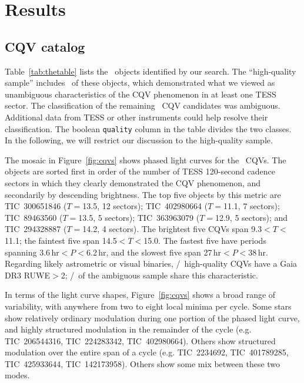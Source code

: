 \documentclass[11pt,twocolumn,tighten]{aastex63}
\begin{document}
\section{Results}
\label{sec:results}

\subsection{CQV catalog}
\label{sec:catalog}

Table~\ref{tab:thetable} lists the \ncpvsfound\ objects identified by
our search.  The ``high-quality sample'' includes \ngoods\ of these
objects, which demonstrated what we viewed as unambiguous
characteristics of the CQV phenomenon in at least one TESS sector.
The classification of the remaining \nmaybes\ CQV candidates was
ambiguous.  Additional data from TESS or other instruments could help
resolve their classification.  The boolean \texttt{quality} column in
the table divides the two classes.  In the following, we will restrict
our discussion to the high-quality sample.

The mosaic in Figure~\ref{fig:cqvs} shows phased light curves for the
\ngoods\ CQVs.  The objects are sorted first in order of the number of
TESS 120-second cadence sectors in which they clearly demonstrated the
CQV phenomenon, and secondarily by descending brightness.  The top
five objects by this metric are TIC~300651846 ($T$$=$13.5, 12
sectors); TIC~402980664 ($T$$=$11.1, 7 sectors); TIC~89463560
($T$$=$13.5, 5 sectors); TIC~363963079 ($T$$=$12.9, 5 sectors); and
TIC~294328887 ($T$$=$14.2, 4 sectors).  The brightest five CQVs span
9.3$<$$T$$<$11.1; the faintest five span 14.5$<$$T$$<$15.0.  The
fastest five have periods spanning 3.6\,hr$<$$P$$<$6.2\,hr, and the
slowest five span 27\,hr$<$$P$$<$38\,hr.  Regarding likely astrometric
or visual binaries, \ngoodhighruwe/\ngoods\ high-quality CQVs have a
Gaia DR3 RUWE$>$2; \nmaybehighruwe/\nmaybes\ of the ambiguous sample
share this characteristic.


In terms of the light curve shapes, Figure~\ref{fig:cqvs} shows a
broad range of variability, with anywhere from two to eight local
minima per cycle.  Some stars show relatively ordinary modulation
during one portion of the phased light curve, and highly structured
modulation in the remainder of the cycle (e.g.  TIC~206544316,
TIC~224283342, TIC~402980664).  Others show structured modulation over
the entire span of a cycle (e.g. TIC~2234692, TIC~401789285,
TIC~425933644, TIC~142173958).  Others show some mix between these two
modes.
\end{document}
